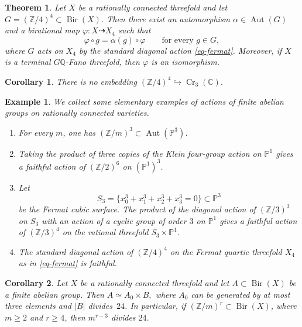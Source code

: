 \documentclass[10pt,a4paper]{amsart}
\newtheorem{theorem}{Theorem}
\newtheorem{corollary}{Corollary}
\newtheorem{example}{Example}
\newcommand{\C}{\mathbb C}
\newcommand{\Cr}{\operatorname{Cr}}
\newcommand{\PP}{\mathbb P}
\newcommand{\Q}{\mathbb Q}
\newcommand{\Z}{\mathbb Z}
\begin{document}
\begin{theorem}
\label{thm-classification}
Let $X$ be a rationally connected threefold and let
$G=(\Z/4)^4\subset\operatorname{Bir}(X)$.  Then there exist an
automorphism $\alpha\in\operatorname{Aut}(G)$ and a birational map
$\varphi\colon X\dashrightarrow X_4$ such that
\[
 \varphi\circ g=\alpha(g)\circ\varphi
 \qquad\text{for every }g\in G,
\]
where $G$ acts on $X_4$ by the standard diagonal action
\eqref{eq-fermat}.
Moreover, if $X$ is a terminal $G\Q$-Fano threefold, then $\varphi$ is an isomorphism.
\end{theorem}

\begin{corollary}
\label{cor-cremona}
There is no embedding
$
 (\Z/4)^4\hookrightarrow\Cr_3(\C).
$
\end{corollary}

\begin{example}
\label{ex-standard-actions}
We collect some elementary examples of actions of finite abelian groups on rationally connected varieties. 
\begin{enumerate}
\item
For every $m$, one has
$(\Z/m)^3\subset\operatorname{Aut}(\PP^3)$.
\item
Taking the product of three copies of the Klein four-group action on
$\mathbb{P}^1$ gives a faithful action of $(\Z/2)^6$ on $(\PP^1)^3$.
\item
Let
\[
 S_3=\{x_0^3+x_1^3+x_2^3+x_3^3=0\}\subset\PP^3
\]
be the Fermat cubic surface.  The product of the diagonal action of
$(\Z/3)^3$ on $S_3$ with an action of a cyclic group of order $3$ on $\PP^1$ gives a faithful
action of $(\Z/3)^4$ on the rational threefold $S_3\times\PP^1$.
\item
The standard diagonal action of $(\Z/4)^4$ on the Fermat quartic
threefold $X_4$ as in \eqref{eq-fermat} is faithful.
\end{enumerate}
\end{example}

\begin{corollary}
\label{cor-kollar-zhuang-uniform}
Let $X$ be a rationally connected threefold and let
$A\subset\operatorname{Bir}(X)$ be a finite abelian group.  Then
$
 A\simeq A_0\times B,
$
where $A_0$ can be generated by at most three elements and
$|B|$ divides~$24$.  In particular, if
$(\Z/m)^r\subset\operatorname{Bir}(X)$, where $m\geq2$ and $r\geq4$,
then $m^{r-3}$ divides $24$.
\end{corollary}
\end{document}
